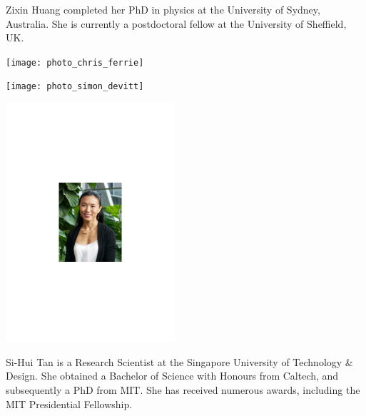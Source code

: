 Zixin Huang completed her PhD in physics at the University of Sydney, Australia. She is currently a postdoctoral fellow at the University of Sheffield, UK.


%
%

\begin{center}
\texttt{[image: photo\_chris\_ferrie]}
\end{center}


%
%

\begin{center}
\texttt{[image: photo\_simon\_devitt]}
\end{center}


%
%

\begin{center}
\includegraphics[width=0.47\textwidth]{photo_sihui_tan}
\end{center}

Si-Hui Tan is a Research Scientist at the Singapore University of Technology \& Design. She obtained a Bachelor of Science with Honours from Caltech, and subsequently a PhD from MIT. She has received numerous awards, including the MIT Presidential Fellowship.


%
%

